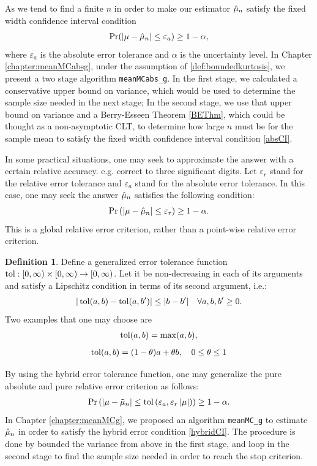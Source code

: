 \documentclass{iitthesis}
\theoremstyle{definition}
\newtheorem{defn}[theorem]{Definition}
\begin{document}
As we tend to find a finite $n$ in order to make our estimator $\hat{\mu}_n$ satisfy the fixed width confidence interval condition 
\begin{align}\label{absCI}
\Pr(\left \lvert \mu-\hat{\mu}_n \right \rvert \leq \varepsilon_a) \geq 1-\alpha,
\end{align}
where $\varepsilon_a$ is the absolute error tolerance and $\alpha$ is the uncertainty level. 
In Chapter \ref{chapter:meanMCabsg}, under the assumption of \eqref{def:boundedkurtosis}, we present a two stage algorithm {\tt meanMCabs\_g}. In the first stage, we calculated a conservative upper bound on variance, which would be used to determine the sample size needed in the next stage; In the second stage, we use that upper bound on variance and a Berry-Esseen Theorem \ref{BEThm}, which could be thought as a non-asymptotic CLT, to determine how large $n$ must be for the sample mean to satisfy the fixed width confidence interval condition \eqref{absCI}.

In some practical situations, one may seek to approximate the answer with a certain relative accuracy. e.g. correct to three significant digits. Let $\varepsilon_r$ stand for the relative error tolerance and $\varepsilon_a$ stand for the absolute error tolerance. In this case, one may seek the answer $\hat{\mu}_n$ satisfies the following condition:
\begin{align}\label{relCI}
\Pr\left(\left \lvert \mu-\hat{\mu}_n \right \rvert\leq \varepsilon_r\right) \geq 1-\alpha.
\end{align}
This is a global relative error criterion, rather than a point-wise relative error criterion. 
\begin{defn}\label{def:tolfun}
 Define a generalized error tolerance function $\operatorname{tol}: [0, \infty) \times [0, \infty) \to [0,\infty)$. Let it be non-decreasing in each of its arguments and satisfy a Lipschitz condition in terms of its second argument, i.e.:
\begin{align}
|\operatorname{tol}(a,b)-\operatorname{tol}(a,b')| \leq |b-b'| \quad \forall a,b,b' \geq 0.
\end{align}
Two examples that one may choose are
\begin{align}
\operatorname{tol}(a,b) = \max (a,b),
\end{align}
\begin{align}
\operatorname{tol}(a,b) = (1- \theta) a + \theta b, \quad 0 \leq \theta \leq 1
\end{align}
\end{defn}By using the hybrid error tolerance function, one may generalize the pure absolute and pure relative error criterion as follows:
\begin{align}\label{hybridCI}
\Pr\left(\left \lvert \mu-\tilde{\mu}_n \right \rvert\leq \operatorname{tol}\left(\varepsilon_a, \varepsilon_r\left \lvert \mu \right \rvert\right)\right) \geq 1-\alpha.
\end{align}
In Chapter \ref{chapter:meanMCg}, we proposed an algorithm {\tt meanMC\_g} to estimate $\hat{\mu}_n$ in order to satisfy the hybrid error condition \eqref{hybridCI}. The procedure is done by bounded the variance from above in the first stage, and loop in the second stage to find the sample size needed in order to reach the stop criterion.
\end{document}
